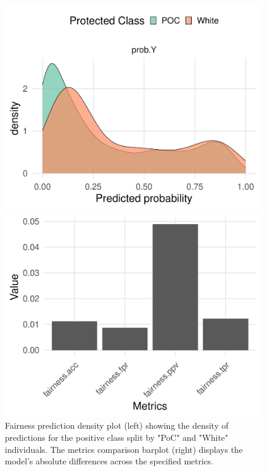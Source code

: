 \begin{figure}
    \centering
    \begin{minipage}{0.49\textwidth}
        \centering
        \includegraphics[width=\textwidth]{../figures/sqf_case_study_plot1.pdf}
    \end{minipage}
    \hfill
    \begin{minipage}{0.49\textwidth}
        \centering
        \includegraphics[width=\textwidth]{../figures/sqf_case_study_plot2.pdf}
    \end{minipage}
    \caption{Fairness prediction density plot (left) showing the density of predictions for the positive class split by "PoC" and "White" individuals. The metrics comparison barplot (right) displays the model's absolute differences across the specified metrics.}
    \label{fig:fairness_density}
\end{figure}

